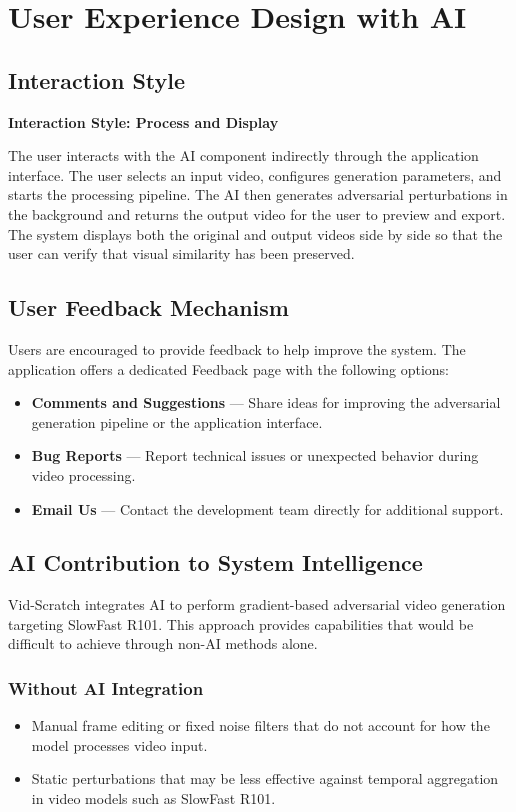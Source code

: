 \section{User Experience Design with AI}
\label{section:user-experience-design-with-AI}

\subsection{Interaction Style}
\textbf{Interaction Style: Process and Display}

The user interacts with the AI component indirectly through 
the application interface. The user selects an input video, 
configures generation parameters, and starts the processing 
pipeline. The AI then generates adversarial perturbations in 
the background and returns the output video for the user to 
preview and export. The system displays both the original 
and output videos side by side so that the user can verify 
that visual similarity has been preserved.

\subsection{User Feedback Mechanism}
Users are encouraged to provide feedback to help improve 
the system. The application offers a dedicated Feedback 
page with the following options:
\begin{itemize}
    \item \textbf{Comments and Suggestions} — Share ideas 
    for improving the adversarial generation pipeline or 
    the application interface.
    \item \textbf{Bug Reports} — Report technical issues or 
    unexpected behavior during video processing.
    \item \textbf{Email Us} — Contact the development team 
    directly for additional support.
\end{itemize}

\subsection{AI Contribution to System Intelligence}

Vid-Scratch integrates AI to perform gradient-based 
adversarial video generation targeting SlowFast R101. This approach 
provides capabilities that would be difficult to achieve 
through non-AI methods alone.

\subsubsection{Without AI Integration}
\begin{itemize}
    \item Manual frame editing or fixed noise filters that 
    do not account for how the model processes video input.
    \item Static perturbations that may be less effective 
    against temporal aggregation in video models such as SlowFast R101.
\end{itemize}

